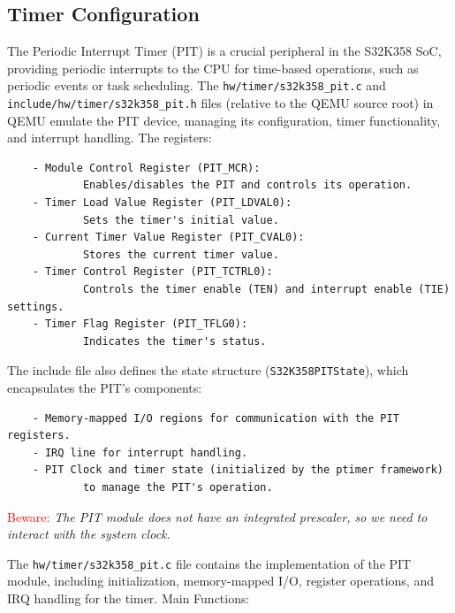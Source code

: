 \subsection{Timer Configuration}
The Periodic Interrupt Timer (PIT) is a crucial peripheral in the S32K358 SoC, providing periodic interrupts to the CPU for time-based operations, such as periodic events or task scheduling. The \texttt{hw/timer/s32k358\_pit.c} and \texttt{include/hw/timer/s32k358\_pit.h} files (relative to the QEMU source root) in QEMU emulate the PIT device, managing its configuration, timer functionality, and interrupt handling.
The registers:
\begin{verbatim}
    - Module Control Register (PIT_MCR): 
            Enables/disables the PIT and controls its operation.
    - Timer Load Value Register (PIT_LDVAL0): 
            Sets the timer's initial value.
    - Current Timer Value Register (PIT_CVAL0): 
            Stores the current timer value.
    - Timer Control Register (PIT_TCTRL0): 
            Controls the timer enable (TEN) and interrupt enable (TIE) settings.
    - Timer Flag Register (PIT_TFLG0): 
            Indicates the timer's status.
\end{verbatim}
The include file also defines the state structure (\texttt{S32K358PITState}), which encapsulates the PIT's components:
\begin{verbatim}
    - Memory-mapped I/O regions for communication with the PIT registers.
    - IRQ line for interrupt handling.
    - PIT Clock and timer state (initialized by the ptimer framework) 
            to manage the PIT's operation.
\end{verbatim}
\begin{center}
    \textcolor{red}{Beware:} \textit{The PIT module does not have an integrated prescaler, so we need to interact with the system clock.}
\end{center}
The \texttt{hw/timer/s32k358\_pit.c} file contains the implementation of the PIT module, including initialization, memory-mapped I/O, register operations, and IRQ handling for the timer.
Main Functions:
